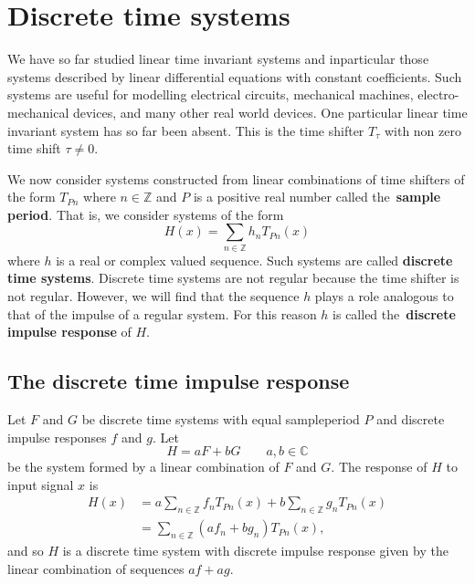 \documentclass[11pt,a4paper]{book}
\theoremstyle{plain}
\numberwithin{equation}{section}
\newcommand{\ints}{{\mathbb Z}}
\newcommand{\complex}{{\mathbb C}}
\newcommand{\term}{\textbf}
\begin{document}


\chapter{Discrete time systems} \label{cha:discr-time-syst}

We have so far studied linear time invariant systems and inparticular those systems described by linear differential equations with constant coefficients.  Such systems are useful for modelling electrical circuits, mechanical machines, electro-mechanical devices, and many other real world devices.  One particular linear time invariant system has so far been absent. This is the time shifter $T_\tau$ with non zero time shift $\tau \neq 0$.  %

We now consider systems constructed from linear combinations of time shifters of the form $T_{Pn}$ where $n \in \ints$ and $P$ is a positive real number called the~\term{sample period}.  That is, we consider systems of the form
\[
H(x) = \sum_{n \in \ints} h_n T_{ P n}(x)
\]
where $h$ is a real or complex valued sequence.  Such systems are called \term{discrete time systems}.  Discrete time systems are not regular because the time shifter is not regular.  However, we will find that the sequence $h$ plays a role analogous to that of the impulse of a regular system.  For this reason $h$  is called the~\term{discrete impulse response} of $H$.


\section{The discrete time impulse response} \label{sec:discr-time-impulse}

Let $F$ and $G$ be discrete time systems with equal sampleperiod $P$ and discrete impulse responses $f$ and $g$.  Let 
\[
H = a F + b G \qquad a,b\in\complex
\]
be the system formed by a linear combination of $F$ and $G$.  The response of $H$ to input signal $x$ is
\begin{align*}
H(x) &= a \sum_{n \in \ints} f_{n} T_{ P n}(x) + b \sum_{n \in \ints} g_{n} T_{ P n}(x) \\
&=  \sum_{n \in \ints} (a f_{n} + b g_{n}) T_{ P n}(x),
\end{align*}
and so $H$ is a discrete time system with discrete impulse response given by the linear combination of sequences $af + ag$.
\end{document}
